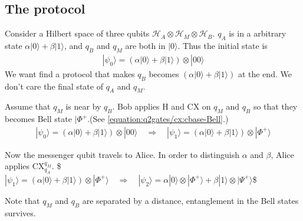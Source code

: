 \documentclass[letterpaper,10pt,english]{jupyterBook}
\begin{document}
\subsection{The protocol}
\label{\detokenize{algorithms/teleportation:the-protocol}}
\sphinxAtStartPar
Consider a Hilbert space of three qubits \(\mathcal{H}_A \otimes \mathcal{H}_M \otimes \mathcal{H}_B\).  \(q_A\) is in a arbitrary state
\(\alpha |0\rangle + \beta |1\rangle\), and  \(q_B\) and \(q_M\) are both in \(|0\rangle\).  Thus the initial state is
\begin{equation*}
\begin{split}
|\psi_0\rangle = \left( \alpha |0\rangle + \beta |1\rangle\right) \otimes |00\rangle
\end{split}
\end{equation*}
\sphinxAtStartPar
We want find a protocol that makes \(q_B\) becomes \(\left( \alpha |0\rangle + \beta |1\rangle\right)\) at the end.  We don’t care the final state of \(q_A\) and \(q_M\).

\sphinxAtStartPar
{}

\sphinxAtStartPar
Assume that \(q_M\) is near by \(q_B\).  Bob applies H and CX on \(q_M\) and \(q_B\) so that they becomes Bell state \(|\Phi^{+}\).(See \eqref{equation:q2gates/cx:cbase-Bell}.)
\begin{equation*}
\begin{split}
|\psi_0\rangle = \left( \alpha |0\rangle + \beta |1\rangle\right) \otimes |00\rangle \quad \Rightarrow \quad  |\psi_1\rangle =\left( \alpha |0\rangle + \beta |1\rangle\right) \otimes |\Phi^{+}\rangle
\end{split}
\end{equation*}
\sphinxAtStartPar
{}

\sphinxAtStartPar
Now the messenger qubit travels to Alice. In order to distinguish \(\alpha\) and \(\beta\), Alice applies CX\(_{q_A}^{q_M}\).
\$\(
|\psi_1\rangle =\left( \alpha |0\rangle + \beta |1\rangle\right) \otimes |\Phi^{+}\rangle \quad \Rightarrow \quad  |\psi_2\rangle = \alpha |0\rangle \otimes |\Phi^{+}\rangle + \beta |1\rangle \otimes |\Psi^{+}\rangle
\)\$

\sphinxAtStartPar
Note that \(q_M\) and \(q_B\) are separated by a distance, entanglement in the Bell states survives.

\sphinxAtStartPar
{}
\end{document}
